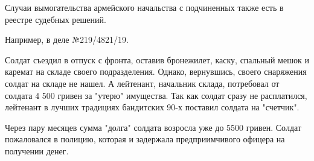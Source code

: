 Случаи вымогательства армейского начальства с подчиненных также есть в реестре
судебных решений.

Например, в деле №219/4821/19.

Солдат съездил в отпуск с фронта, оставив бронежилет, каску, спальный мешок и
каремат на складе своего подразделения. Однако, вернувшись, своего снаряжения
солдат на складе не нашел. А лейтенант, начальник склада, потребовал от солдата
4 500 гривен за "утерю" имущества. Так как солдат сразу не расплатился,
лейтенант в лучших традициях бандитских 90-х поставил солдата на "счетчик".

Через пару месяцев сумма "долга" солдата возросла уже до 5500 гривен. Солдат
пожаловался в полицию, которая и задержала предприимчивого офицера на получении
денег.
